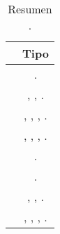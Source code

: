 

\begin{table}[H]
    \centering
\begin{tabular}{ |l|c| }

\hline
	&
	Tipo \frameworkPC%


\\ \hline
	\derbyNAMEref &
	\isomorphicJSFwASref.%
	
\\ \hline
	\socketStreamNAMEref &
	\socketStreamNAMEref, \emberjsNAME, \nodejsNAME.%
	
\\ \hline
	\meanstackNAMEref &
	\mongodbNAME, \expressjsNAME, \angularjsNAME, \nodejsNAME.%
	
\\ \hline
	\meenstackNAMEref &
	\mongodbNAME, \emberjsNAME, \expressjsNAME, \nodejsNAME.%
 
\\ \hline
	\meteorNAMEref &
	\isomorphicJSFwASref.%
	
\\ \hline
	\mojitoNAMEref &
	\isomorphicJSFwASref.%
	
\\ \hline
	\saneNAMEref &
	\sailsNAME, \emberjsNAME, \nodejsNAME. %
	
	
\\ \hline
	\sleekjsNAMEref &
	\handlebarsNAME, \expressjsNAME, \mongooseNAME, \nodejsNAME.%
	

\\ \hline
\end{tabular}
    \caption{Resumen \fullStackJSFwASref.}
    \label{tab:resume_full_stack_javaScript}
\end{table}
